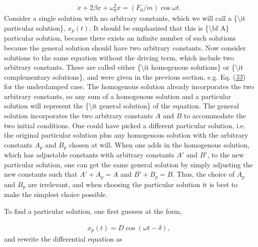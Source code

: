 \documentclass[letterpaper,10pt,english]{sphinxmanual}
\begin{document}
\begin{equation*}
\begin{split}
\begin{equation}
\label{eq:drivenosc} \tag{58}
\ddot{x}+2\beta\dot{x}+\omega_0^2x=(F_0/m)\cos\omega t.
\end{equation}
\end{split}
\end{equation*}
Consider a single solution with no arbitrary constants, which we will
call a \{\textbackslash{}it particular solution\}, \(x_p(t)\). It should be emphasized
that this is \{\textbackslash{}bf A\} particular solution, because there exists an
infinite number of such solutions because the general solution should
have two arbitrary constants. Now consider solutions to the same
equation without the driving term, which include two arbitrary
constants. These are called either \{\textbackslash{}it homogenous solutions\} or \{\textbackslash{}it
complementary solutions\}, and were given in the previous section,
e.g. Eq. ({\hyperref[\detokenize{chapter1:eq:homogsolution}]{\emph{55}}}) for the underdamped case. The
homogenous solution already incorporates the two arbitrary constants,
so any sum of a homogenous solution and a particular solution will
represent the \{\textbackslash{}it general solution\} of the equation. The general
solution incorporates the two arbitrary constants \(A\) and \(B\) to
accommodate the two initial conditions. One could have picked a
different particular solution, i.e. the original particular solution
plus any homogenous solution with the arbitrary constants \(A_p\) and
\(B_p\) chosen at will. When one adds in the homogenous solution, which
has adjustable constants with arbitrary constants \(A'\) and \(B'\), to
the new particular solution, one can get the same general solution by
simply adjusting the new constants such that \(A'+A_p=A\) and
\(B'+B_p=B\). Thus, the choice of \(A_p\) and \(B_p\) are irrelevant, and
when choosing the particular solution it is best to make the simplest
choice possible.

To find a particular solution, one first guesses at the form,




\begin{equation*}
\begin{split}
\begin{equation}
\label{eq:partform} \tag{59}
x_p(t)=D\cos(\omega t-\delta),
\end{equation}
\end{split}
\end{equation*}
and rewrite the differential equation as
\end{document}
